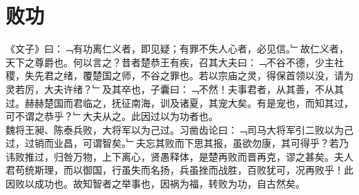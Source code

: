 \chapter{败功}%
《文子》曰：﹁有功离仁义者，即见疑；有罪不失人心者，必见信。﹂故仁义者，天下之尊爵也。何以言之？昔者楚恭王有疾，召其大夫曰：﹁不谷不德，少主社稷，失先君之绪，覆楚国之师，不谷之罪也。若以宗庙之灵，得保首领以没，请为灵若厉，大夫许绪？﹂及其卒也，子囊曰：﹁不然！夫事君者，从其善，不从其过。赫赫楚国而君临之，抚征南海，训及诸夏，其宠大矣。有是宠也，而知其过，可不谓之恭乎？﹂大夫从之。此因过以为功者也。\\
魏将王昶、陈泰兵败，大将军以为己过。习凿齿论曰：﹁司马大将军引二败以为己过，过销而业昌，可谓智矣。﹂夫忘其败而下思其报，虽欲勿康，其可得乎？若乃讳败推过，归咎万物，上下离心，贤愚释体，是楚再败而晋再克，谬之甚矣。夫人君苟统斯理，而以御国，行虽失而名扬，兵虽挫而战胜，百败犹可，况再败乎！此因败以成功也。故知智者之举事也，因祸为福，转败为功，自古然矣。
\\%
%
